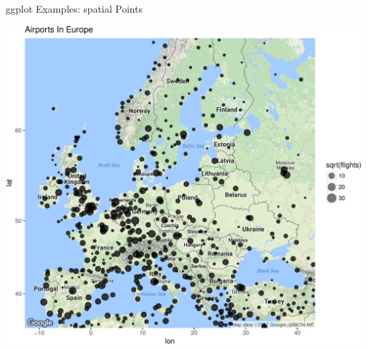 \documentclass[10pt,ignorenonframetext,]{beamer}
\begin{document}
\begin{frame}{ggplot Examples: spatial Points}

\begin{center}\includegraphics[width=0.8\linewidth]{SpatialDataLecture_files/figure-beamer/unnamed-chunk-45-1} \end{center}

\end{frame}
\end{document}
